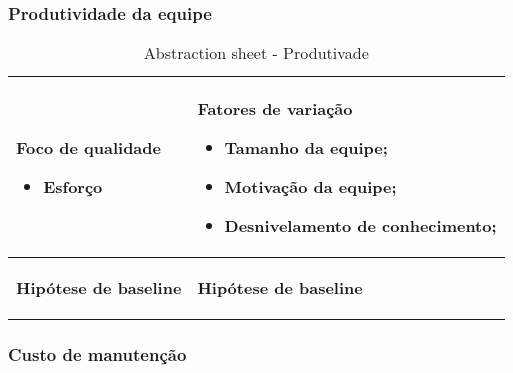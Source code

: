 \subsubsection{Produtividade da equipe}

\begin{table}[H]
\centering
\begin{tabular}{|p{4cm}|p{4cm}|}
\hline
	\begin{center}
	\textbf{Foco de qualidade}
	\end{center}

	\begin{itemize}
		\item Esforço
	\end{itemize}

	&

	\begin{center}
	\textbf{Fatores de variação}
	\end{center}

	\begin{itemize}
		\item{Tamanho da equipe;}
		\item{Motivação da equipe;}
		\item{Desnivelamento de conhecimento;}
	\end{itemize}

	\\ \hline
	\begin{center}
	\textbf{Hipótese de baseline}
	\end{center}

	&

	\begin{center}
	\textbf{Hipótese de baseline}
	\end{center}

	\\ \hline
\end{tabular}
\caption{Abstraction sheet - Produtivade}
\label{tab:produtividade_sheet}
\end{table}

\subsubsection{Custo de manutenção}

